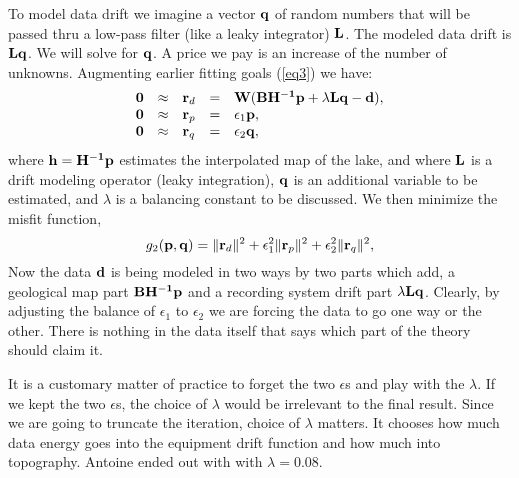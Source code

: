 To model data drift we imagine a vector $\bold q$ of random numbers
that will be passed thru a low-pass filter (like a leaky integrator) $\bold L$.
The modeled data drift is $\bold L\bold q$.
We will solve for $\bold q$.
A price we pay is an increase of the number of unknowns.
Augmenting earlier fitting goals
(\ref{eq3}) we have:
\begin{equation}
  \begin{array}{lllll}
    \bold 0 &\approx& \bold r_d &=& \bold W ( \bold B \bold {H^{-1}} \bold p + \lambda
    \bold L \bold q - \bold d
    ),\\
    \bold 0 &\approx& \bold r_p &=& \epsilon_1 \bold p ,\\
    \bold 0 &\approx& \bold r_q &=& \epsilon_2 \bold q,
  \end{array} \label{eq4}
\end{equation}
where ${\bf h}={\bf H^{-1}p}$ estimates the interpolated map of the lake, and
where ${\bf L}$ is a drift modeling operator (leaky integration),
${\bf q}$ is an additional variable to be estimated,
and $\lambda$ is a balancing constant to be discussed.
We then minimize the misfit function,
\begin{equation}
  g_2(\bold p,\bold q) = \|\bold r_d\|^2+\epsilon_1^2\|\bold r_p\|^2+\epsilon_2^2\|\bold r_q\|^2,
\end{equation}
Now the data $\bold d$ is being modeled in two ways
by two parts which add,
a geological map part $\bold B \bold {H^{-1}} \bold p$
and a recording system drift part $\lambda\bold L \bold q$.
Clearly, by adjusting the balance of
$\epsilon_1$ to
$\epsilon_2$ we are forcing the data to go one way or the other.
There is nothing in the data itself that says which part of
the theory should claim it.



\par
It is a customary matter of practice to forget the two $\epsilon$s
and play with the $\lambda$.
If we kept the two $\epsilon$s,
the choice of $\lambda$ would be irrelevant to the final result.
Since we are going to truncate the iteration,
choice of $\lambda$ matters.
It chooses how much data energy goes into the equipment drift function
and how much into topography.
Antoine ended out with with $\lambda=0.08$.

